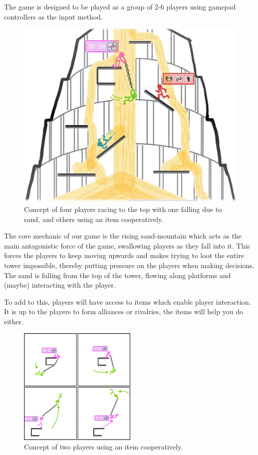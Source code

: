 The game is designed to be played as a group of 2-6 players using gamepad controllers as the input method.

\begin{figure}
    \centering
    \includegraphics{figures/topmeifyoucan_concept.jpg}
    \caption{Concept of four players racing to the top with one falling due to sand, and others using an item cooperatively.}
    \label{fig:concept}
\end{figure}

The core mechanic of our game is the rising sand-mountain which acts as the main antagonistic force of the game, swallowing players as they fall into it. This forces the players to keep moving upwards and makes trying to loot the entire tower impossible, thereby putting pressure on the players when making decisions. The sand is falling from the top of the tower, flowing along platforms and (maybe) interacting with the player.

To add to this, players will have access to items which enable player interaction. It is up to the players to form alliances or rivalries, the items will help you do either.

\begin{figure}[h]
    \centering
    \includegraphics[width=0.5\textwidth]{figures/topmeifyoucan_concept_rope_coop.png}
    \caption{Concept of two players using an item cooperatively.}
    \label{fig:concept-coop}
\end{figure}

